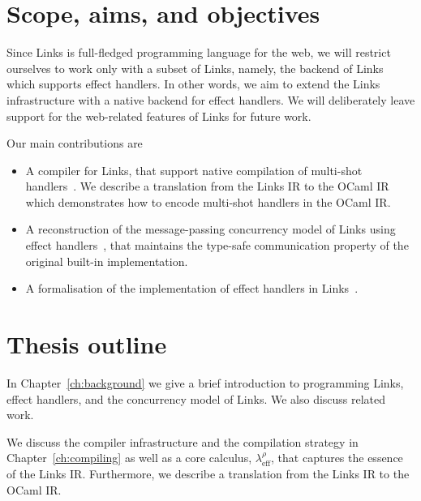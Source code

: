 \documentclass[12pt,mscres,cdtppar,twoside,openright,logo,rightchapter,normalheadings]{infthesis}
\theoremstyle{definition}
\newcommand{\Calc}{\ensuremath{\lambda_{\text{eff}}^\rho}\xspace}
\begin{document}


\section{Scope, aims, and objectives}

Since Links is full-fledged programming language for the web, we will
restrict ourselves to work only with a subset of Links, namely, the
backend of Links which supports effect handlers. In other words, we
aim to extend the Links infrastructure with a native backend for
effect handlers. We will deliberately leave support for the
web-related features of Links for future work.

Our main contributions are
\begin{itemize}
\item A compiler for Links, that support native compilation of
  multi-shot handlers~\citep{Hillerstrom2016b}. We describe a
  translation from the Links IR to the OCaml IR which demonstrates how
  to encode multi-shot handlers in the OCaml IR.
\item A reconstruction of the message-passing concurrency model of
  Links using effect handlers~\citep{Hillerstrom2016c}, that maintains
  the type-safe communication property of the original built-in
  implementation.
\item A formalisation of the implementation of effect handlers in
  Links~\citep{Hillerstrom2016a}.
\end{itemize}

\section{Thesis outline}

In Chapter~\ref{ch:background} we give a brief introduction to
programming Links, effect handlers, and the concurrency model of
Links. We also discuss related work.

We discuss the compiler infrastructure and the compilation strategy in
Chapter~\ref{ch:compiling} as well as a core calculus, \Calc{}, that
captures the essence of the Links IR. Furthermore, we describe a
translation from the Links IR to the OCaml IR.
\end{document}
